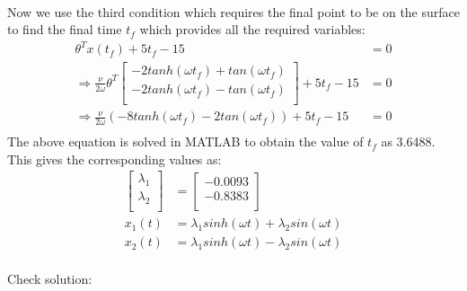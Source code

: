 \begin{enumerate}
\begin{enumerate}
\begin{align*}
   \end{align*}
   Now we use the third condition which requires the final point to be on the surface to find the final time $t_f$ which provides all the required variables:
   \begin{align*}
    \theta^{T} x(t_f) + 5t_f - 15 &= 0\\
    \Rightarrow \frac{\nu}{2 \omega} \theta^{T} 
    \begin{bmatrix}
    -2tanh(\omega t_f) + tan(\omega t_f)\\
    -2tanh(\omega t_f) - tan(\omega t_f)\\
  \end{bmatrix} + 5t_f - 15 &= 0\\ 
  \Rightarrow \frac{\nu}{2 \omega} (-8 tanh(\omega t_f) -2 tan(\omega t_f) ) + 5t_f - 15 &= 0\\
\end{align*}
The above equation is solved in MATLAB to obtain the value of $t_f$ as 3.6488. This gives the corresponding values as:
\begin{align*}
 \begin{bmatrix}
  \lambda_1 \\
  \lambda_2 \\
 \end{bmatrix} &= 
 \begin{bmatrix}
  -0.0093 \\
  -0.8383 \\
 \end{bmatrix}\\
 x_1(t) &= \lambda_1 sinh(\omega t) + \lambda_2 sin(\omega t) \\
 x_2(t) &= \lambda_1 sinh(\omega t) - \lambda_2 sin(\omega t) \\
\end{align*}

Check solution: 



\end{enumerate}
\end{enumerate}
